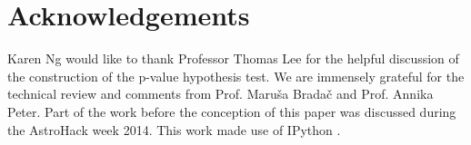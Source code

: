 \section{Acknowledgements}
Karen Ng would like to thank Professor Thomas Lee for the helpful discussion of 
the construction of the p-value hypothesis test. We are immensely grateful for 
the technical review and comments from Prof. Maru\v{s}a Brada\v{c} and Prof. Annika Peter.  
Part of the work before the conception of this paper was discussed during 
the AstroHack week 2014. This work made use of {\sc IPython}
\citep{Perez2007}.
